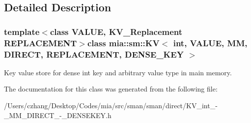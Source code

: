\subsection{Detailed Description}
\subsubsection*{template$<$class V\-A\-L\-U\-E, K\-V\-\_\-\-Replacement R\-E\-P\-L\-A\-C\-E\-M\-E\-N\-T$>$class mia\-::sm\-::\-K\-V$<$ int, V\-A\-L\-U\-E, M\-M, D\-I\-R\-E\-C\-T, R\-E\-P\-L\-A\-C\-E\-M\-E\-N\-T, D\-E\-N\-S\-E\-\_\-\-K\-E\-Y $>$}

Key value store for dense int key and arbitrary value type in main memory. 

The documentation for this class was generated from the following file\-:\begin{DoxyCompactItemize}
\item 
/\-Users/czhang/\-Desktop/\-Codes/mia/src/sman/sman/direct/K\-V\-\_\-int\-\_\--\/\-\_\-\-M\-M\-\_\-\-D\-I\-R\-E\-C\-T\-\_\--\/\-\_\-\-D\-E\-N\-S\-E\-K\-E\-Y.\-h\end{DoxyCompactItemize}
